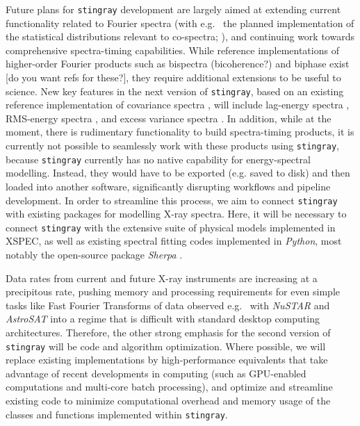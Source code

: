 \documentclass[twocolumn]{aastex62}
\newcommand{\stingray}{\texttt{stingray}\xspace}
\begin{document}
Future plans for \stingray development are largely aimed at extending current functionality related to Fourier spectra (with e.g.~ the planned implementation of the statistical distributions relevant to co-spectra; \citealt{huppenkothen2017}), and continuing work towards comprehensive spectra-timing capabilities. While reference implementations of higher-order Fourier products such as bispectra (bicoherence?) and biphase exist [do you want refs for these?], they require additional extensions to be useful to science. New key features in the next version of \stingray, based on an existing reference implementation of covariance spectra \citep{WilkinsonUttley09}, will include lag-energy spectra \citep{Vaughanetal94}, RMS-energy spectra \citep{Revnivtsevetal99}, and excess variance spectra \citep{Vaughanetal03}. In addition, while at the moment, there is rudimentary functionality to build spectra-timing products, it is currently not possible to seamlessly work with these products using \stingray, because \stingray currently has no native capability for energy-spectral modelling. Instead, they would have to be exported (e.g. saved to disk) and then loaded into another software, significantly disrupting workflows and pipeline development. In order to streamline this process, we aim to connect \stingray with existing packages for modelling X-ray spectra. Here, it will be necessary to connect \stingray with the extensive suite of physical models implemented in XSPEC, as well as existing spectral fitting codes implemented in \textit{Python}, most notably the open-source package \textit{Sherpa} \citep{sherpa}.

Data rates from current and future X-ray instruments are increasing at a precipitous rate, pushing memory and processing requirements for even simple tasks like Fast Fourier Transforms of data observed e.g.~ with \textit{NuSTAR} and \textit{AstroSAT} \citep{singh2014} into a regime that is difficult with standard desktop computing architectures. Therefore, the other strong emphasis for the second version of \stingray will be code and algorithm optimization. Where possible, we will replace existing implementations by high-performance equivalents that take advantage of recent developments in computing (such as GPU-enabled computations and multi-core batch processing), and optimize and streamline existing code to minimize computational overhead and memory usage of the classes and functions implemented within \stingray. 

\end{document}
